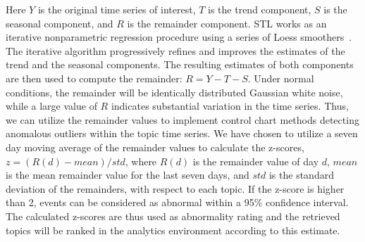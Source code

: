 %
Here $Y$ is the original time series of interest, 
$T$ is the trend component,
$S$ is the seasonal component,
and $R$ is the remainder component.
%
STL works as an iterative nonparametric regression procedure using a series of Loess smoothers~\cite{Cleveland:1979:RLW}.
The iterative algorithm progressively refines and improves the estimates of the trend 
and the seasonal components.
The resulting estimates of both components are then used to compute the remainder:
$R = Y - T - S$.
Under normal conditions, the remainder will be identically distributed Gaussian white noise, while a large value of $R$ indicates substantial variation in the time series. 
Thus, we can utilize the remainder values to implement control chart methods detecting anomalous outliers 
within the topic time series.
We have chosen to utilize a seven day moving average of the remainder values to calculate the z-scores, 
$z = (R(d) - mean)/std$, where $R(d)$ is the remainder value of day $d$, $mean$ is the mean remainder value for the last seven days, and $std$ is the standard deviation of the remainders,
with respect to each topic.  
If the z-score is higher than 2, events can be considered as abnormal within a 95\% confidence interval.
The calculated z-scores are thus used as abnormality rating and the retrieved topics will be ranked in the analytics environment according to this estimate.


